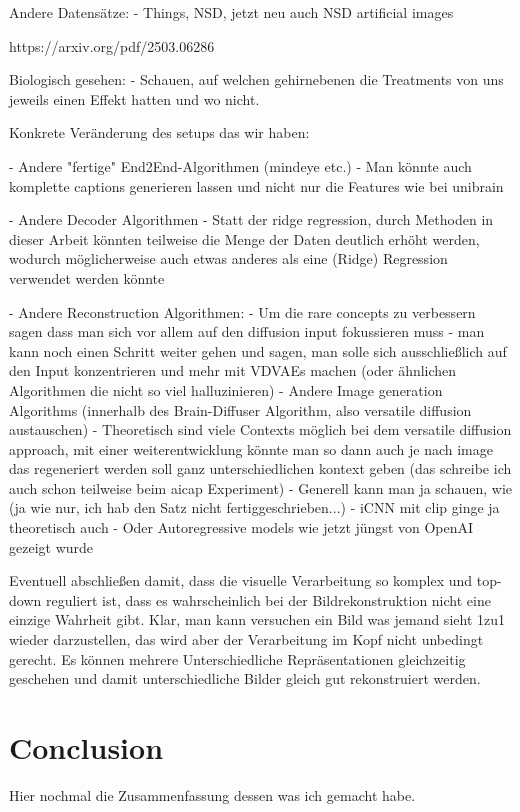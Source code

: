 Andere Datensätze:
- Things, NSD, jetzt neu auch NSD artificial images 

https://arxiv.org/pdf/2503.06286

Biologisch gesehen:
- Schauen, auf welchen gehirnebenen die Treatments von uns jeweils einen Effekt hatten und wo nicht.

Konkrete Veränderung des setups das wir haben:

- Andere "fertige" End2End-Algorithmen (mindeye etc.)
    - Man könnte auch komplette captions generieren lassen und nicht nur die Features wie bei unibrain \cite{maiUniBrainUnifyImage2023}

- Andere Decoder Algorithmen 
    - Statt der ridge regression, durch Methoden in dieser Arbeit könnten teilweise die Menge der Daten deutlich erhöht werden, wodurch möglicherweise auch etwas anderes als eine (Ridge) Regression verwendet werden könnte

- Andere Reconstruction Algorithmen:
    - Um die rare concepts zu verbessern sagen \cite{samuelGeneratingImagesRare2024} dass man sich vor allem auf den diffusion input fokussieren muss
        - man kann noch einen Schritt weiter gehen und sagen, man solle sich ausschließlich auf den Input konzentrieren und mehr mit VDVAEs machen (oder ähnlichen Algorithmen die nicht so viel halluzinieren)
    - Andere Image generation Algorithms (innerhalb des Brain-Diffuser Algorithm, also versatile diffusion austauschen)
    - Theoretisch sind viele Contexts möglich bei dem versatile diffusion approach, mit einer weiterentwicklung könnte man so dann auch je nach image das regeneriert werden soll ganz unterschiedlichen kontext geben (das schreibe ich auch schon teilweise beim aicap Experiment)
    - Generell kann man ja schauen, wie (ja wie nur, ich hab den Satz nicht fertiggeschrieben...)
    - iCNN mit clip ginge ja theoretisch auch
    - Oder Autoregressive models wie jetzt jüngst von OpenAI gezeigt wurde


Eventuell abschließen damit, dass die visuelle Verarbeitung so komplex und top-down reguliert ist, dass es wahrscheinlich bei der Bildrekonstruktion nicht eine einzige Wahrheit gibt. Klar, man kann versuchen ein Bild was jemand sieht 1zu1 wieder darzustellen, das wird aber der Verarbeitung im Kopf nicht unbedingt gerecht. Es können mehrere Unterschiedliche Repräsentationen gleichzeitig geschehen und damit unterschiedliche Bilder gleich gut rekonstruiert werden. 


\section{Conclusion}
Hier nochmal die Zusammenfassung dessen was ich gemacht habe. 


